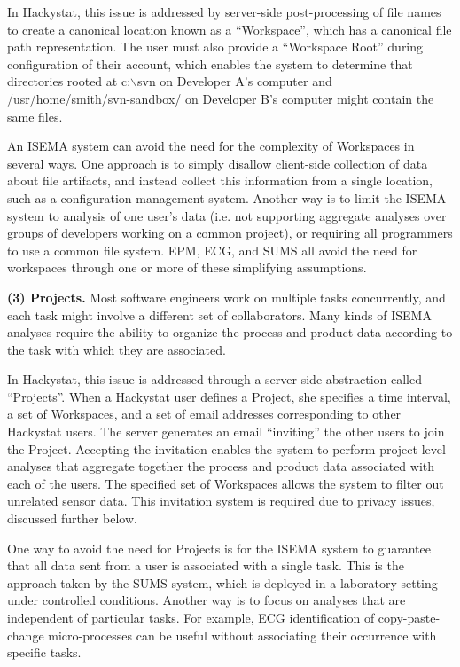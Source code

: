 \documentclass[10pt,twocolumn]{article}
\begin{document}
In Hackystat, this issue is addressed by server-side post-processing of
file names to create a canonical location known as a ``Workspace'', which
has a canonical file path representation. The user must also provide a
``Workspace Root'' during configuration of their account, which enables the
system to determine that directories rooted at c:$\backslash$svn on
Developer A's computer and /usr/home/smith/svn-sandbox/ on Developer B's
computer might contain the same files. 

An ISEMA system can avoid the need for the complexity of Workspaces in
several ways.  One approach is to simply disallow client-side
collection of data about file artifacts, and instead collect this
information from a single location, such as a configuration management
system.  Another way is to limit the ISEMA system to analysis of one user's
data (i.e. not supporting aggregate analyses over groups of developers
working on a common project), or requiring all programmers to use a common
file system. EPM, ECG, and SUMS all avoid the need for workspaces through
one or more of these simplifying assumptions.

{\bf (3) Projects.} Most software engineers work on multiple tasks
concurrently, and each task might involve a different set of collaborators. 
Many kinds of ISEMA analyses require the ability to organize the process
and product data according to the task with which they are associated.

In Hackystat, this issue is addressed through a server-side abstraction
called ``Projects''.  When a Hackystat user defines a Project, she specifies
a time interval, a set of Workspaces, and a set of email addresses
corresponding to other Hackystat users.  The server generates an email
``inviting'' the other users to join the Project. Accepting
the invitation enables the system to perform project-level analyses that
aggregate together the process and product data associated with each of the
users. The specified set of Workspaces allows the system to filter out 
unrelated sensor data.  This invitation system is required due to privacy
issues, discussed further below.

One way to avoid the need for Projects is for the ISEMA system to guarantee
that all data sent from a user is associated with a single task. This is
the approach taken by the SUMS system, which is deployed in a laboratory
setting under controlled conditions. Another way is to focus on analyses
that are independent of particular tasks. For example, ECG identification
of copy-paste-change micro-processes can be useful without associating
their occurrence with specific tasks.
\end{document}
